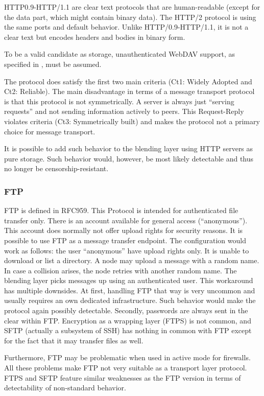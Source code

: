 HTTP0.9-HTTP/1.1 are clear text protocols that are human-readable (except for the data part, which might contain binary data). The HTTP/2\cite{rfc7540} protocol is using the same ports and default behavior. Unlike HTTP/0.9-HTTP/1.1, it is not a clear text but encodes headers and bodies in binary form. 

To be a valid candidate as storage, unauthenticated WebDAV support, as specified in \cite{rfc4918}, must be assumed.

The protocol does satisfy the first two main criteria (Ct1: Widely Adopted and Ct2: Reliable). The main disadvantage in terms of a message transport protocol is that this protocol is not symmetrically. A server is always just ``serving requests'' and not sending information actively to peers. This Request-Reply violates criteria (Ct3: Symmetrically built) and makes the protocol not a primary choice for message transport. 

It is possible to add such behavior to the blending layer using HTTP servers as pure storage. Such behavior would, however, be most likely detectable and thus no longer be censorship-resistant.

\subsubsection*{FTP}
FTP is defined in RFC959\cite{rfc959}. This Protocol is intended for authenticated file transfer only. There is an account available for general access (``anonymous''). This account does normally not offer upload rights for security reasons. It is possible to use FTP as a message transfer endpoint. The configuration would work as follows: the user ``anonymous'' have upload rights only. It is unable to download or list a directory. A node may upload a message with a random name. In case a collision arises, the node retries with another random name. The blending layer picks messages up using an authenticated user. This workaround has multiple downsides. At first, handling FTP that way is very uncommon and usually requires an own dedicated infrastructure. Such behavior would make the protocol again possibly detectable. Secondly, passwords are always sent in the clear within FTP. Encryption as a wrapping layer (FTPS) is not common, and SFTP (actually a subsystem of SSH) has nothing in common with FTP except for the fact that it may transfer files as well.

Furthermore, FTP may be problematic when used in active mode for firewalls. All these problems make FTP not very suitable as a transport layer protocol. FTPS and SFTP feature similar weaknesses as the FTP version in terms of detectability of non-standard behavior.

